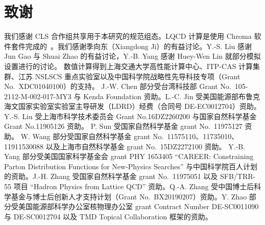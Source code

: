 \section*{致谢}
我们感谢 CLS 合作组共享用于本研究的规范组态。LQCD 计算是使用 Chroma 软件套件完成的~\cite{Edwards:2004sx}。我们感谢季向东（Xiangdong Ji）的有益讨论。Y.-S. Liu 感谢 Jun Gao 与 Shuai Zhao 的有益讨论，Y.-B. Yang 感谢 Huey-Wen Lin 就部分模拟设置进行的讨论。
数值计算得到上海交通大学高性能计算中心、ITP-CAS 计算集群、江苏 NSLSCS 重点实验室以及中国科学院战略性先导科技专项（Grant No.\ XDC01040100）的支持。
J.-W. Chen 部分受台湾科技部 Grant No.\ 105-2112-M-002-017-MY3 与 Kenda Foundation 资助。L.-C. Jin 受美国能源部布鲁克海文国家实验室实验室主导研发（LDRD）经费（合同号 DE-EC0012704）资助。Y.-S. Liu 受上海市科学技术委员会 Grant No.16DZ2260200 与国家自然科学基金 Grant No.11905126 资助。
P. Sun 受国家自然科学基金 grant No.\ 11975127 资助。
W. Wang 部分受国家自然科学基金 grant No.\ 11575110、11735010、11911530088 以及上海市自然科学基金 grant No.\ 15DZ2272100 资助。
Y.-B. Yang 部分受美国国家科学基金会 grant PHY 1653405 ``CAREER: Constraining Parton Distribution Functions for New-Physics Searches'' 与中国科学院百人计划的资助。J.-H. Zhang 受国家自然科学基金 grant No.\ 11975051 以及 SFB/TRR-55 项目 ``Hadron Physics from Lattice QCD'' 资助。Q.-A. Zhang 受中国博士后科学基金与博士后创新人才支持计划（Grant No.\ BX20190207）资助。Y. Zhao 部分受美国能源部科学办公室核物理办公室 grant Contract Number DE-SC0011090 与 DE-SC0012704 以及 TMD Topical Collaboration 框架的资助。

\appendix

